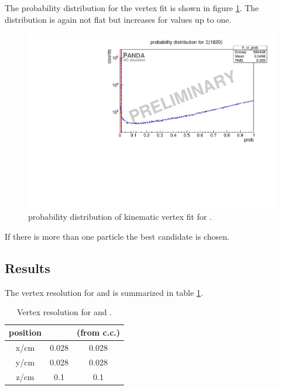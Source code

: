 		
		The \chisq probability distribution for the vertex fit is shown in figure \ref{fig:xi1820_prob}.
		The distribution is again not flat but increases for values up to one. 
		
		\begin{figure}
			\centering
			\includegraphics[width=1.\textwidth]{./plots/Xi1820/XiMinus1820_prob.pdf}
			\caption{\chisq probability distribution of kinematic vertex fit for \excitedcascade.}
			\label{fig:xi1820_prob}
		\end{figure}
		
		If there is more than one particle the best candidate is chosen.
		
	\subsection*{Results}
	The vertex resolution for \excitedcascade and \excitedanticascade is summarized in table \ref{tab:Xi1820_vtxres}.
	
	\begin{table}
		\centering
		\caption{Vertex resolution for \excitedcascade and \excitedanticascade.}
		\label{tab:Xi1820_vtxres}
		\begin{tabular}{ccc}
			\hline
			position & \excitedcascade & \excitedanticascade (from c.c.) \\
			\hline
			\hline
			x/cm & 0.028 & 0.028\\
			y/cm & 0.028 & 0.028\\
			z/cm & 0.1 & 0.1\\
			\hline
			 
		\end{tabular}
	\end{table}
	
